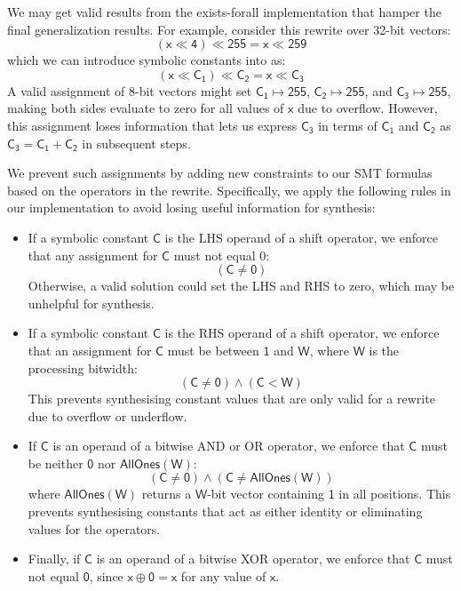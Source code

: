 \documentclass[review, anonymous, acmsmall]{acmart}
\newcommand{\blockmath}[1]{\[\mathsf{#1}\]}
\newcommand{\inline}[1]{$\mathsf{#1}$}
\begin{document}
We may get valid results from the exists-forall implementation that hamper the final generalization results. For example, consider this rewrite over 32-bit vectors:
    \blockmath{(x \ll 4) \ll 255 = x \ll 259}
which we can introduce symbolic constants into as:
    \blockmath{(x \ll C_1) \ll C_2 = x \ll C_3}
A valid assignment of 8-bit vectors might set \inline{C_1 \mapsto 255}, \inline{C_2 \mapsto 255}, and \inline{C_3 \mapsto 255}, making both sides evaluate to zero for all values of \inline{x} due to overflow. However, this assignment loses information that lets us express \inline{C_3} in terms of \inline{C_1} and \inline{C_2} as \inline{C_3 = C_1 + C_2} in subsequent steps. 

We prevent such assignments by adding new constraints to our SMT formulas based on the operators in the rewrite. Specifically, we apply the following rules in our implementation to avoid losing useful information for synthesis:
\begin{itemize}
    \item If a symbolic constant \inline{C} is the LHS operand of a shift operator, we enforce that any assignment for \inline{C} must not equal 0:
                             \blockmath{(C \neq 0)}
    Otherwise, a valid solution could set the LHS and RHS to zero, which may be unhelpful for synthesis.
    \item If a symbolic constant \inline{C} is the RHS operand of a shift operator, we enforce that an assignment for \inline{C} must be between \inline{1} and \inline{W}, where \inline{W} is the processing bitwidth:
                             \blockmath{(C \neq 0) \land (C < W)}
    This prevents synthesising constant values that are only valid for a rewrite due to overflow or underflow. 
    \item If  \inline{C} is an operand of a bitwise AND or OR operator, we enforce that \inline{C} must be neither \inline{0} nor \inline{AllOnes(W)}:
    \blockmath{(C \neq 0) \land (C \neq AllOnes(W))}
    where \inline{AllOnes(W)} returns a \inline{W}-bit vector containing \inline{1} in all positions. This prevents synthesising constants that act as either identity or eliminating values for the operators.
    \item Finally, if \inline{C} is an operand of a bitwise XOR operator, we enforce that \inline{C} must not equal \inline{0}, since \inline{x \oplus 0 = x} for any value of \inline{x}.
\end{itemize}
\end{document}
